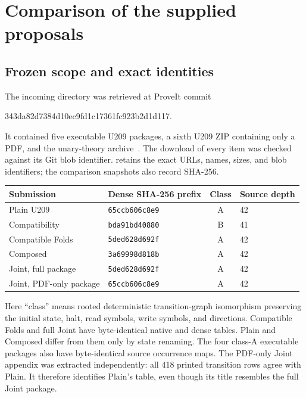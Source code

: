 \section{Comparison of the supplied proposals}
\label{sec:comparison}
\subsection{Frozen scope and exact identities}
The incoming directory was retrieved at ProveIt commit
\begin{center}\small\ttfamily
343da82d7384d10ec9fd1c17361fc923b2d1d117.
\end{center}
It contained five executable U209 packages, a sixth U209 ZIP containing
only a PDF, and the unary-theory archive~\cite{unary,plain,compat,folds,composed,joint,jointpdf}.
The download of every item was checked against its Git blob identifier.
 retains the exact URLs, names,
sizes, and blob identifiers; the comparison snapshots also record SHA-256.

\begin{center}
\small
\begin{tabular}{@{}llcl@{}}
\toprule
Submission & Dense SHA-256 prefix & Class & Source depth\\
\midrule
Plain U209 & \texttt{65ccb606c8e9} & A & 42\\
Compatibility & \texttt{bda91bd40880} & B & 41\\
Compatible Folds & \texttt{5ded628d692f} & A & 42\\
Composed & \texttt{3a69998d818b} & A & 42\\
Joint, full package & \texttt{5ded628d692f} & A & 42\\
Joint, PDF-only package & \texttt{65ccb606c8e9} & A & 42\\
\bottomrule
\end{tabular}
\end{center}

Here ``class'' means rooted deterministic transition-graph isomorphism
preserving the initial state, halt, read symbols, write symbols, and
directions. Compatible Folds and full Joint have byte-identical native
and dense tables. Plain and Composed differ from them only by state
renaming. The four class-A executable packages also have byte-identical
source occurrence maps. The PDF-only Joint appendix was extracted
independently: all 418 printed transition rows agree with Plain. It
therefore identifies Plain's table, even though its title resembles
the full Joint package.


